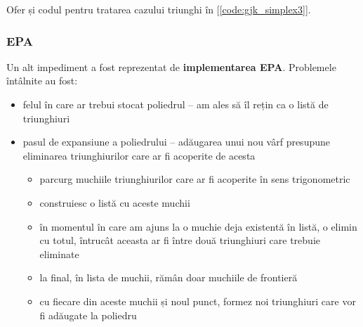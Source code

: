 \documentclass[12pt,a4paper]{report}
\begin{document}
Ofer și codul pentru tratarea cazului triunghi în [\autoref{code:gjk_simplex3}].
\subsubsection{EPA}

Un alt impediment a fost reprezentat de \textbf{implementarea EPA}. Problemele întâlnite au fost:
\begin{itemize}
	\item felul în care ar trebui stocat poliedrul -- am ales să îl rețin ca o listă de triunghiuri
	\item pasul de expansiune a poliedrului -- adăugarea unui nou vârf presupune eliminarea  triunghiurilor care ar fi acoperite de acesta
	\begin{itemize}
		\item parcurg muchiile triunghiurilor care ar fi acoperite în sens trigonometric
		\item construiesc o listă cu aceste muchii
		\item în momentul în care am ajuns la o muchie deja existentă în listă, o elimin cu totul, întrucât aceasta ar fi între două triunghiuri care trebuie eliminate
		\item la final, în lista de muchii, rămân doar muchiile de frontieră
		\item cu fiecare din aceste muchii și noul punct, formez noi triunghiuri care vor fi adăugate la poliedru
	\end{itemize}
\end{itemize}
\end{document}

